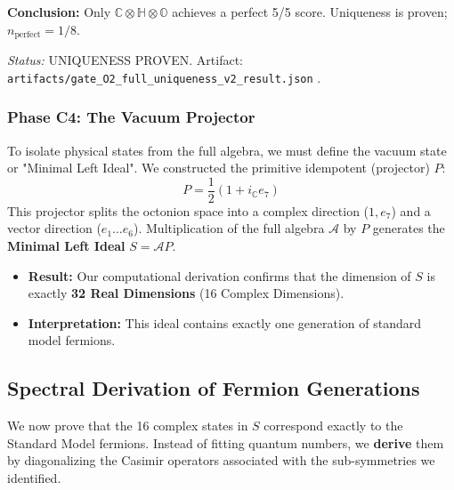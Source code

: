 \begin{tcolorbox}[colback=blue!5!white, colframe=blue!50!black, title={Proof O2 — Uniqueness of $\mathbb{C}\otimes\mathbb{H}\otimes\mathbb{O}$: Full 8-Candidate Scan (UNIQUENESS PROVEN)}]
\textbf{Conclusion:} Only $\mathbb{C}\otimes\mathbb{H}\otimes\mathbb{O}$ achieves a perfect 5/5 score. Uniqueness is proven; $n_\text{perfect} = 1/8$.

\textit{Status:} UNIQUENESS PROVEN. Artifact: \texttt{artifacts/\allowbreak gate\_\allowbreak O2\_\allowbreak full\_\allowbreak uniqueness\_\allowbreak v2\_\allowbreak result.json} \cite{baez,schafer1966}.
\end{tcolorbox}

\subsubsection{Phase C4: The Vacuum Projector}
To isolate physical states from the full algebra, we must define the vacuum state or "Minimal Left Ideal".
We constructed the primitive idempotent (projector) $P$:
\begin{equation}
    P = \frac{1}{2} (1 + i_{\mathbb{C}} e_7)
\end{equation}
This projector splits the octonion space into a complex direction ($1, e_7$) and a vector direction ($e_1 \dots e_6$).
Multiplication of the full algebra $\mathcal{A}$ by $P$ generates the \textbf{Minimal Left Ideal} $S = \mathcal{A}P$.
\begin{itemize}
    \item \textbf{Result:} Our computational derivation confirms that the dimension of $S$ is exactly \textbf{32 Real Dimensions} (16 Complex Dimensions).
    \item \textbf{Interpretation:} This ideal contains exactly one generation of standard model fermions.
\end{itemize}

\subsection{Spectral Derivation of Fermion Generations}
We now prove that the 16 complex states in $S$ correspond exactly to the Standard Model fermions.
Instead of fitting quantum numbers, we \textbf{derive} them by diagonalizing the Casimir operators associated with the sub-symmetries we identified.

